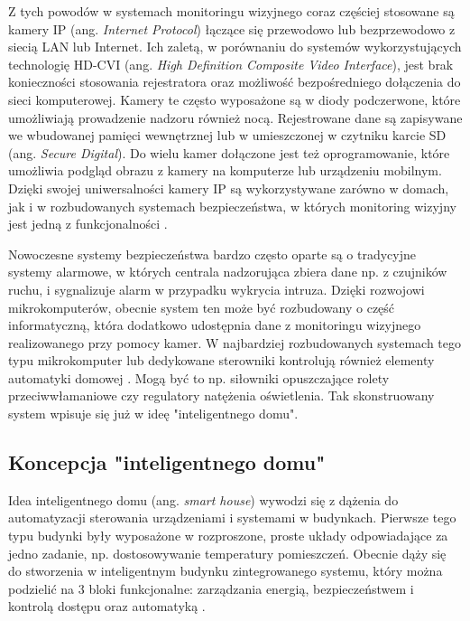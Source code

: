 \documentclass[a4paper,11pt,twoside]{article}
\begin{document}
Z tych powodów w systemach monitoringu wizyjnego coraz częściej stosowane są kamery IP (ang. \textit{Internet Protocol}) łączące się przewodowo lub bezprzewodowo z siecią LAN lub Internet. Ich zaletą, w porównaniu do systemów wykorzystujących technologię HD-CVI (ang. \textit{High Definition Composite Video Interface}), jest brak konieczności stosowania rejestratora oraz możliwość bezpośredniego dołączenia do sieci komputerowej. Kamery te często wyposażone są w diody podczerwone, które umożliwiają prowadzenie nadzoru również nocą. Rejestrowane dane są zapisywane we wbudowanej pamięci wewnętrznej lub w umieszczonej w czytniku karcie SD (ang. \textit{Secure Digital}). Do wielu kamer dołączone jest też oprogramowanie, które umożliwia podgląd obrazu z kamery na komputerze lub urządzeniu mobilnym. Dzięki swojej uniwersalności kamery IP są wykorzystywane zarówno w domach, jak i w rozbudowanych systemach bezpieczeństwa, w których monitoring wizyjny jest jedną z funkcjonalności \cite{komputer_świat}\cite{kamery-ip}.

Nowoczesne systemy bezpieczeństwa bardzo często oparte są o tradycyjne systemy alarmowe, w których centrala nadzorująca zbiera dane np. z czujników ruchu, i sygnalizuje alarm w przypadku wykrycia intruza. Dzięki rozwojowi mikrokomputerów, obecnie system ten może być rozbudowany o część informatyczną, która dodatkowo udostępnia dane z monitoringu wizyjnego realizowanego przy pomocy kamer. W najbardziej rozbudowanych systemach tego typu mikrokomputer lub dedykowane sterowniki kontrolują również elementy automatyki domowej \cite{monitoring}. Mogą być to np. siłowniki opuszczające rolety przeciwwłamaniowe czy regulatory natężenia oświetlenia. Tak skonstruowany system wpisuje się już w ideę "inteligentnego domu".

\subsection{Koncepcja "inteligentnego domu"}
Idea inteligentnego domu (ang. \textit{smart house}) wywodzi się z dążenia do automatyzacji sterowania urządzeniami i systemami w budynkach. Pierwsze tego typu budynki były wyposażone w rozproszone, proste układy odpowiadające za jedno zadanie, np. dostosowywanie temperatury pomieszczeń. Obecnie dąży się do stworzenia w inteligentnym budynku zintegrowanego systemu, który można podzielić na 3 bloki funkcjonalne: zarządzania energią, bezpieczeństwem i kontrolą dostępu oraz automatyką \cite{inteligentny_dom}.
\end{document}
